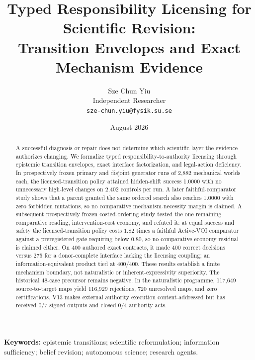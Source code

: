 \documentclass[11pt]{article}
\title{Typed Responsibility Licensing for Scientific Revision:\\
Transition Envelopes and Exact Mechanism Evidence}
\author{Sze Chun Yiu\\Independent Researcher\\\texttt{sze-chun.yiu@fysik.su.se}}
\date{August 2026}
\gdef\pOneBibDatabases{bibliography,novelty_refresh_2026}
\begin{document}
\maketitle



\begin{abstract}
A successful diagnosis or repair does not determine which scientific layer the
evidence authorizes changing. We formalize typed responsibility-to-authority
licensing through epistemic transition envelopes, exact interface factorization,
and legal-action deficiency. In prospectively frozen primary and disjoint
generator runs of 2,882 mechanical worlds each, the licensed-transition policy
attained hidden-shift success 1.0000 with no unnecessary high-level changes on
2,402 controls per run. A later faithful-comparator study shows that a parent
granted the same ordered search also reaches 1.0000 with zero forbidden
mutations, so no comparative mechanism-necessity margin is claimed. A subsequent
prospectively frozen costed-ordering study tested the one remaining comparative
reading, intervention-cost economy, and refuted it: at equal success and safety the
licensed-transition policy costs $1.82$ times a faithful Active-VOI comparator against
a preregistered gate requiring below $0.80$, so no comparative economy residual is
claimed either.
On 400 authored exact contracts, it made 400 correct decisions versus
275 for a donor-complete interface lacking the licensing coupling; an
information-equivalent product tied at 400/400. These results establish a finite
mechanism boundary, not naturalistic or inherent-expressivity superiority. The
historical 48-case precursor remains negative. In the naturalistic programme,
117,649 source-to-target maps yield 116,929 rejections, 720 unresolved maps, and
zero certifications. V13 makes external authority execution content-addressed
but has received 0/7 signed outputs and closed 0/4 authority acts.
\end{abstract}

\noindent\textbf{Keywords:} epistemic transitions; scientific reformulation; information sufficiency; belief revision; autonomous science; research agents.




















\end{document}
